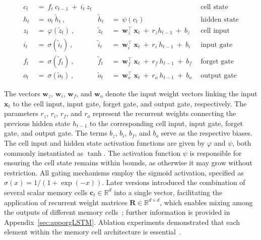 \begin{align}
c_t \ &= \  f_t \ c_{t-1} \ + \ i_t \ z_t &  & &\text{cell state} \\
h_t  \ &= \ o_t \ \tilde{h}_t \ , & \tilde{h}_t \ &= \ \psi \left( c_t\right)
  &\text{hidden state} \\
z_t \ &= \ \varphi \left( \tilde{z}_t \right) \ , 
  &\tilde{z}_t \ &=  \ \mathbf{w}^\top_{z} \ \mathbf{x}_t \ + \
  r_{z}  h_{t-1} \ + \  b_{z} \ \
  &\text{cell input} \\
i_t \ &= \ \sigma \left( \tilde{i}_t  \right) \ , 
  &\tilde{i}_t \ &= \ \mathbf{w}^\top_{i} \ \mathbf{x}_t \ + \
  r_{i}  \ h_{t-1} \ + \  b_{i} \ \
  &\text{input gate} \\
f_t \ &= \ \sigma \left(  \tilde{f}_t \right) \ , 
  &\tilde{f}_t \ &= \ \mathbf{w}^\top_{f} \ \mathbf{x}_t  \ + \
  r_{f}  \ h_{t-1} \ + \  b_{f} \ \
  &\text{forget gate} \\
o_t \ &= \ \sigma \left( \tilde{o}_t \right) \ , 
  &\tilde{o}_t  \ &= \ \mathbf{w}^\top_{o} \ \mathbf{x}_t \ + \
  r_{o}  \ h_{t-1} \ + \  b_{o} \ \
  &\text{output gate} 
\end{align}

The vectors $\mathbf{w}_{z}$, $\mathbf{w}_{i}$, $\mathbf{w}_{f}$, and $\mathbf{w}_{o}$ denote the input weight vectors linking the input $\mathbf{x}_t$ to the cell input, input gate, forget gate, and output gate, respectively. The parameters $r_{z}$, $r_{i}$, $r_{f}$, and $r_{o}$ represent the recurrent weights connecting the previous hidden state $h_{t-1}$ to the corresponding cell input, input gate, forget gate, and output gate. The terms $b_{z}$, $b_{i}$, $b_{f}$, and $b_{o}$ serve as the respective biases. The cell input and hidden state activation functions are given by $\varphi$ and $\psi$, both commonly instantiated as $\tanh$. The activation function $\psi$ is responsible for ensuring the cell state remains within bounds, as otherwise it may grow without restriction. All gating mechanisms employ the sigmoid activation, specified as $\sigma \left( x \right)= 1/(1+\exp(-x))$. Later versions introduced the combination of several scalar memory cells $\mathbf{c}_t \in \mathbb{R}^{d}$ into a single vector, facilitating the application of recurrent weight matrices $\mathbf{R} \in \mathbb{R}^{d \times d}$, which enables mixing among the outputs of different memory cells~\citep{Greff:15}; further information is provided in Appendix~\ref{sec:apporgLSTM}. Ablation experiments demonstrated that each element within the memory cell architecture is essential~\citep{Greff:15}.

